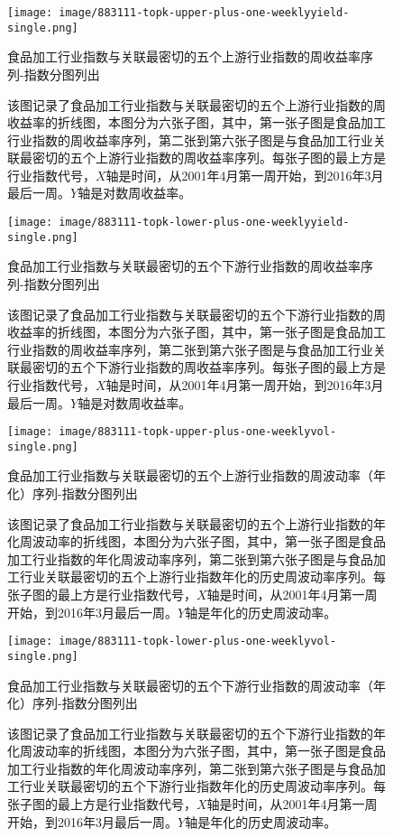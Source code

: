 \documentclass{sysuthesis}
\begin{document}
  \begin{figure}[htbp]
  \centering
  \texttt{[image: image/883111-topk-upper-plus-one-weeklyyield-single.png]}
  \caption{食品加工行业指数与关联最密切的五个上游行业指数的周收益率序列-指数分图列出}
  \caption*{\footnotesize 该图记录了食品加工行业指数与关联最密切的五个上游行业指数的周收益率的折线图，本图分为六张子图，其中，第一张子图是食品加工行业指数的周收益率序列，第二张到第六张子图是与食品加工行业关联最密切的五个上游行业指数的周收益率序列。每张子图的最上方是行业指数代号，$X$轴是时间，从2001年4月第一周开始，到2016年3月最后一周。$Y$轴是对数周收益率。}
  \label{fig:883111-topk-upper-plus-one-weeklyyield-single}
  \end{figure}

  \begin{figure}[htbp]
  \centering
  \texttt{[image: image/883111-topk-lower-plus-one-weeklyyield-single.png]}
  \caption{食品加工行业指数与关联最密切的五个下游行业指数的周收益率序列-指数分图列出}
  \caption*{\footnotesize 该图记录了食品加工行业指数与关联最密切的五个下游行业指数的周收益率的折线图，本图分为六张子图，其中，第一张子图是食品加工行业指数的周收益率序列，第二张到第六张子图是与食品加工行业关联最密切的五个下游行业指数的周收益率序列。每张子图的最上方是行业指数代号，$X$轴是时间，从2001年4月第一周开始，到2016年3月最后一周。$Y$轴是对数周收益率。}
  \label{fig:883111-topk-lower-plus-one-weeklyyield-single}
  \end{figure}


  \begin{figure}[htbp]
  \centering
  \texttt{[image: image/883111-topk-upper-plus-one-weeklyvol-single.png]}
  \caption{食品加工行业指数与关联最密切的五个上游行业指数的周波动率（年化）序列-指数分图列出}
  \caption*{\footnotesize 该图记录了食品加工行业指数与关联最密切的五个上游行业指数的年化周波动率的折线图，本图分为六张子图，其中，第一张子图是食品加工行业指数的年化周波动率序列，第二张到第六张子图是与食品加工行业关联最密切的五个上游行业指数年化的历史周波动率序列。每张子图的最上方是行业指数代号，$X$轴是时间，从2001年4月第一周开始，到2016年3月最后一周。$Y$轴是年化的历史周波动率。}
  \label{fig:883111-topk-upper-plus-one-weeklyvol-single}
  \end{figure}


  \begin{figure}[htbp]
  \centering
  \texttt{[image: image/883111-topk-lower-plus-one-weeklyvol-single.png]}
  \caption{食品加工行业指数与关联最密切的五个下游行业指数的周波动率（年化）序列-指数分图列出}
  \caption*{\footnotesize 该图记录了食品加工行业指数与关联最密切的五个下游行业指数的年化周波动率的折线图，本图分为六张子图，其中，第一张子图是食品加工行业指数的年化周波动率序列，第二张到第六张子图是与食品加工行业关联最密切的五个下游行业指数年化的历史周波动率序列。每张子图的最上方是行业指数代号，$X$轴是时间，从2001年4月第一周开始，到2016年3月最后一周。$Y$轴是年化的历史周波动率。}
  \label{fig:883111-topk-lower-plus-one-weeklyvol-single}
  \end{figure}
\end{document}
